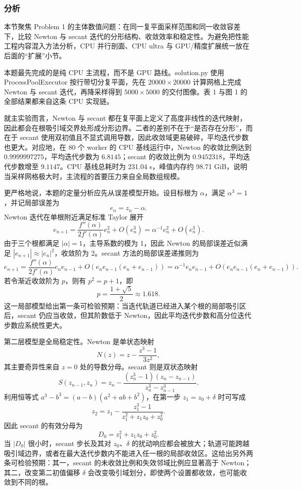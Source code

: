 \documentclass[12pt,a4paper,fontset=none]{ctexart}
\newcommand{\blocktitle}[1]{\subsubsection{#1}}
\newcommand{\codeinline}[1]{{\normalfont #1}}
\begin{document}
\blocktitle{分析}

本节聚焦 Problem 1 的主体数值问题：在同一复平面采样范围和同一收敛容差下，比较 Newton 与 secant 迭代的分形结构、收敛效率和稳定性。为避免把性能工程内容混入方法分析，CPU 并行剖面、CPU ultra 与 GPU/精度扩展统一放在后面的``扩展''小节。

本题最先完成的是纯 CPU 主流程，而不是 GPU 路线。\codeinline{solution.py} 使用 \codeinline{ProcessPoolExecutor} 按行带切分复平面，先在 \(20000\times 20000\) 计算网格上完成 Newton 与 secant 迭代，再降采样得到 \(5000\times 5000\) 的交付图像。表 1 与图 1 的全部结果都来自这条 CPU 实现链。

就主实验而言，Newton 与 secant 都在复平面上定义了高度非线性的迭代映射，因此都会在根吸引域交界处形成分形边界。二者的差别不在于``是否存在分形''，而在于 secant 使用双初值且不显式调用导数，因此收敛域更易破碎，平均迭代步数也更大。对应地，在 80 个 worker 的 CPU 基线运行中，Newton 的收敛比例达到 \(0.9999997275\)，平均迭代步数为 \(6.8145\)；secant 的收敛比例为 \(0.9452318\)，平均迭代步数增至 \(9.1147\)。CPU 基线总耗时为 231.04 s，峰值内存约 98.71 GiB，说明当采样网格极大时，主流程的首要压力来自全局数组规模。

更严格地说，本题的定量分析应先从误差模型开始。设目标根为 \(\alpha\)，满足 \(\alpha^3=1\)，并记局部误差为
\[
e_n=z_n-\alpha .
\]
Newton 迭代在单根附近满足标准 Taylor 展开
\[
e_{n+1}
=\frac{f''(\alpha)}{2f'(\alpha)}e_n^2+O(e_n^3)
=\alpha^{-1}e_n^2+O(e_n^3).
\]
由于三个根都满足 \(|\alpha|=1\)，主导系数的模为 1，因此 Newton 的局部误差近似满足 \(|e_{n+1}|\approx |e_n|^2\)，收敛阶为 2。secant 方法的局部误差递推则为
\[
e_{n+1}
=\frac{f''(\alpha)}{2f'(\alpha)}e_ne_{n-1}
 +O(e_ne_{n-1}(e_n+e_{n-1}))
=\alpha^{-1}e_ne_{n-1}+O(e_ne_{n-1}(e_n+e_{n-1})).
\]
若令渐近收敛阶为 \(p\)，则有 \(p^2=p+1\)，即
\[
p=\frac{1+\sqrt{5}}{2}\approx 1.618 .
\]
这一局部模型给出第一条可检验预期：当迭代轨道已经进入某个根的局部吸引区后，secant 仍应当收敛，但其阶数低于 Newton，因此平均迭代步数和高分位迭代步数应系统性更大。

第二层模型是全局稳定性。Newton 是单状态映射
\[
N(z)=z-\frac{z^3-1}{3z^2},
\]
其主要奇异性来自 \(z=0\) 处的导数分母。secant 则是双状态映射
\[
S(z_{n-1},z_n)
=z_n-\frac{(z_n^3-1)(z_n-z_{n-1})}{z_n^3-z_{n-1}^3}.
\]
利用恒等式 \(a^3-b^3=(a-b)(a^2+ab+b^2)\)，在第一步 \(z_1=z_0+\delta\) 时可写成
\[
z_2
=z_1-\frac{z_1^3-1}{z_1^2+z_1z_0+z_0^2}.
\]
因此 secant 的有效分母为
\[
D_0=z_1^2+z_1z_0+z_0^2 .
\]
当 \(|D_0|\) 很小时，secant 步长及其对 \(z_0\)、\(\delta\) 的扰动响应都会被放大；轨道可能跨越吸引域边界，或者在最大迭代步数内不能进入任一根的局部收敛区。这给出另外两条可检验预期：其一，secant 的未收敛比例和失效邻域比例应显著高于 Newton；其二，改变第二初值偏移 \(\delta\) 会改变吸引域划分，即使两个设置都收敛，也可能收敛到不同的根。
\end{document}
